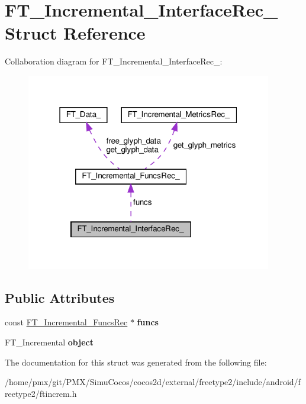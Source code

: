 \hypertarget{structFT__Incremental__InterfaceRec__}{}\section{F\+T\+\_\+\+Incremental\+\_\+\+Interface\+Rec\+\_\+ Struct Reference}
\label{structFT__Incremental__InterfaceRec__}


Collaboration diagram for F\+T\+\_\+\+Incremental\+\_\+\+Interface\+Rec\+\_\+\+:
\nopagebreak
\begin{figure}[H]
\begin{center}
\leavevmode
\includegraphics[width=304pt]{structFT__Incremental__InterfaceRec____coll__graph}
\end{center}
\end{figure}
\subsection*{Public Attributes}
\begin{DoxyCompactItemize}
\item 
\mbox{\label{structFT__Incremental__InterfaceRec___a8f0c1a8e49901dd9767d915c99c82255}} 
const \hyperlink{structFT__Incremental__FuncsRec__}{F\+T\+\_\+\+Incremental\+\_\+\+Funcs\+Rec} $\ast$ {\bfseries funcs}
\item 
\mbox{\label{structFT__Incremental__InterfaceRec___ae4f527f53465ff84ad01b484fe721a88}} 
F\+T\+\_\+\+Incremental {\bfseries object}
\end{DoxyCompactItemize}


The documentation for this struct was generated from the following file\+:\begin{DoxyCompactItemize}
\item 
/home/pmx/git/\+P\+M\+X/\+Simu\+Cocos/cocos2d/external/freetype2/include/android/freetype2/ftincrem.\+h\end{DoxyCompactItemize}
